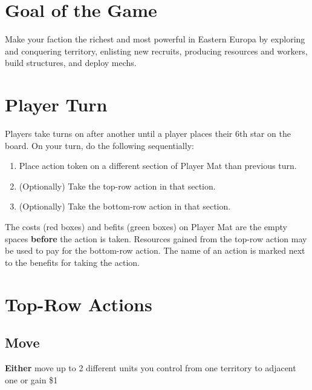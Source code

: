 \documentclass[12pt]{article}
\newenvironment{enumerateCustom}
{\begin{enumerate}
  \setlength{\itemsep}{1pt}
  \setlength{\parskip}{0pt}
  \setlength{\parsep}{0pt}}
{\end{enumerate}}
\begin{document}
\begin{multicols*}{2}
\section*{Goal of the Game}
Make your faction the richest and most powerful in Eastern Europa by exploring and conquering territory, enlisting new recruits, producing resources and workers, build structures, and deploy mechs.

\section*{Player Turn}
Players take turns on after another until a player places their 6th star on the board. On your turn, do the following sequentially:

\begin{enumerateCustom}
    \item Place action token on a different section of Player Mat than previous turn.
    \item (Optionally) Take the top-row action in that section.
    \item (Optionally) Take the bottom-row action in that section.
\end{enumerateCustom}

    The costs (red boxes) and befits (green boxes) on Player Mat are the empty spaces \textbf{before} the action is taken. Resources gained from the top-row action may be used to pay for the bottom-row action. The name of an action is marked next to the benefits for taking the action.

\section*{Top-Row Actions}
\subsection*{Move}
\textbf{Either} move up to 2 different units you control from one territory to adjacent one or gain \$1


\end{multicols*}
\end{document}
